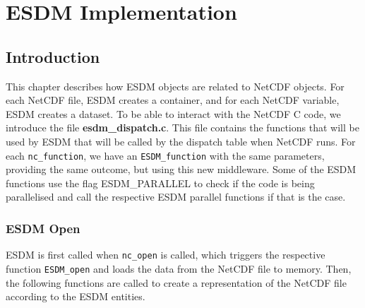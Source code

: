 \chapter{ESDM Implementation}
\label{ch:imp}

\section{Introduction}

This chapter describes how ESDM objects are related to NetCDF objects.
For each NetCDF file, ESDM creates a container, and for each NetCDF variable, ESDM creates a dataset.
To be able to interact with the NetCDF C code, we introduce the file \textbf{esdm\_dispatch.c}.
This file contains the functions that will be used by ESDM that will be called by the dispatch table when NetCDF runs.
For each \texttt{nc\_function}, we have an \texttt{ESDM\_function} with the same parameters, providing the same outcome, but using this new middleware.
Some of the ESDM functions use the flag ESDM\_PARALLEL to check if the code is being parallelised and call the respective ESDM parallel functions if that is the case.

\subsection{ESDM Open}

ESDM is first called when \texttt{nc\_open} is called, which triggers the respective function \texttt{ESDM\_open} and loads the data from the NetCDF file to memory.
Then, the following functions are called to create a representation of the NetCDF file according to the ESDM entities.

